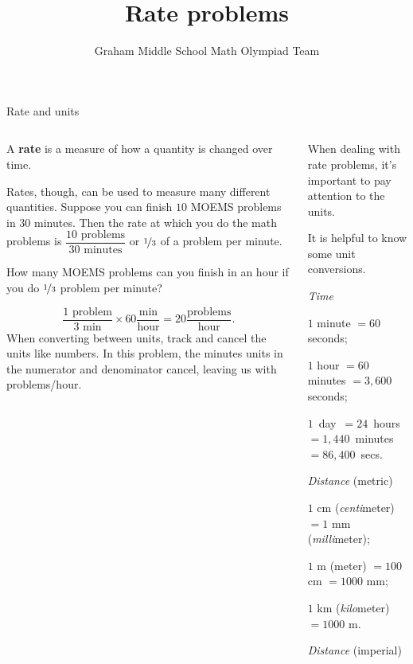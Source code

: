 \documentclass[9pt,aspectratio=169]{beamer}
\title{Rate problems}
\subtitle[Graham Middle School]{Graham Middle School Math Olympiad Team}
\begin{document}
\maketitle

\begin{frame}{Rate and units}
  \begin{columns}[T]
    \begin{column}{0.5\textwidth}
      \begin{definition}
        A \textbf{rate} is a measure of how a quantity is changed over time.
      \end{definition}
      Rates, though, can be used to measure many different quantities. Suppose you can finish $10$ MOEMS problems in $30$ minutes.  Then the rate at which you do the math problems is $\dfrac{10\text{ problems}}{30\text{ minutes}}$ or $\nicefrac{1}{3}$ of a problem per minute.
      \begin{problem}
        How many MOEMS problems can you finish in an hour if you do $\nicefrac{1}{3}$ problem per minute?
      \end{problem}\vspace*{-0.7em}
      \[ \dfrac{1\text{ problem}}{3\text{ min}} \times 60 \dfrac{\text{min}}{\text{hour}} = 20 \dfrac{\text{problems}}{\text{hour}}.\]
      When converting between units, track and cancel the units like numbers. In this problem, the minutes units in the numerator and denominator cancel, leaving us with problems/hour. 
    \end{column}
    \begin{column}{0.5\textwidth}
      When dealing with rate problems, it’s important to pay attention to the units.
      
      It is helpful to know some unit conversions.\smallskip

      \emph{Time}

      $1$ minute $= 60$ seconds;

      $1$ hour $= 60$ minutes $= 3{,}600$ seconds;

      \mbox{$1$ day $= 24$ hours $= 1{,}440$ minutes $= 86{,}400$ secs.}\smallskip

      \emph{Distance} (metric)

      $1$ cm (\emph{centi}meter) $= 1$ mm (\emph{milli}meter); 

      $1$ m (meter) $= 100$ cm $= 1000$ mm;

      $1$ km (\emph{kilo}meter) $= 1000$ m.\smallskip

      \emph{Distance} (imperial)


\end{column}
\end{columns}
\end{frame}
\end{document}
